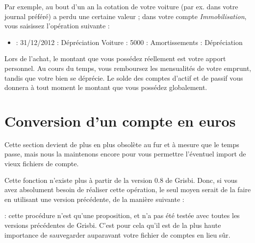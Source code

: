 Par exemple, au bout d'un an la cotation de votre voiture (par ex. dans votre journal préféré) a perdu une certaine valeur ; dans votre compte \emph{Immobilisation}, vous saisissez l'opération suivante : 

\begin{itemize}
	\item {} : 31/12/2012   : Dépréciation Voiture   : 5000   : Amortissements : Dépréciation
\end{itemize}

Lors de l'achat, le montant que vous possédez réellement est votre apport personnel. Au cours du temps, vous remboursez les mensualités de votre emprunt, tandis que votre bien se déprécie. Le solde des comptes d'actif et de passif vous donnera à tout moment le montant que vous possédez globalement.


\section{Conversion d'un compte en euros\label{accounts-switcheuro}}


Cette section devient de plus en plus obsolète au fur et à mesure que le 
temps passe, mais nous la maintenons encore pour vous permettre l'éventuel
import de vieux fichiers de compte.

Cette fonction n'existe plus à partir de la version 0.8 de Grisbi. Donc, si vous avez absolument
besoin de réaliser cette opération, le seul moyen serait de la faire en utilisant une version précédente, de la manière suivante :

 : cette procédure n'est qu'une proposition, et n'a pas été
testée avec toutes les versions précédentes de Grisbi. C'est pour cela qu'il est
de la plus haute importance de sauvegarder auparavant votre fichier de comptes en lieu sûr.

